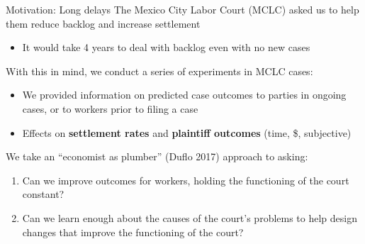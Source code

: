 \documentclass[9pt]{beamer}
\begin{document}
  
 \begin{frame}{Motivation: Long delays}
  The Mexico City Labor Court (MCLC) asked us to help them reduce backlog and increase settlement
  \begin{itemize}
      \item It would take 4 years to deal with backlog even with no new cases


  \end{itemize} 
  
  \vspace{4mm}
  \pause
  
    With this in mind, we conduct a series of experiments in MCLC cases:
    \begin{itemize}
        \item We provided information on predicted case outcomes to parties in \alert{ongoing} cases, or to workers \alert{prior to filing} a case
        \item Effects on \textbf{settlement rates} and \textbf{plaintiff outcomes} (time, \$, subjective)
    \end{itemize}
\pause
\vspace{4mm}
We take an ``economist as plumber'' (Duflo 2017) approach to asking:
\begin{enumerate}
    \item Can we improve outcomes for workers, holding the functioning of the court constant?
    \item Can we learn enough about the causes of the court's problems to help design changes that improve the functioning of the court?
\end{enumerate}
\end{frame}
\end{document}
